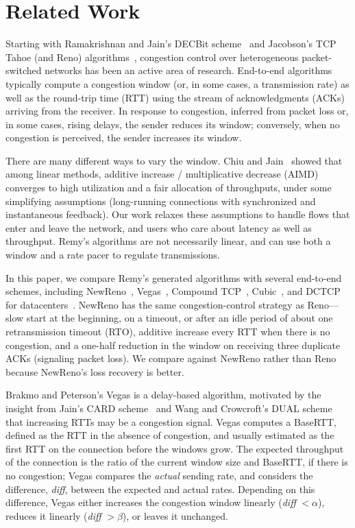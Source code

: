 \section{Related Work}
\label{remy:related}

Starting with Ramakrishnan and Jain's DECBit scheme~\cite{decbit} and
Jacobson's TCP Tahoe (and Reno) algorithms~\cite{Jacobson88},
congestion control over heterogeneous packet-switched networks has
been an active area of research. End-to-end algorithms typically
compute a congestion window (or, in some cases, a transmission rate)
as well as the round-trip time (RTT) using the stream of
acknowledgments (ACKs) arriving from the receiver. In response to
congestion, inferred from packet loss or, in some cases, rising
delays, the sender reduces its window; conversely, when no congestion
is perceived, the sender increases its window.

There are many different ways to vary the window. Chiu and
Jain~\cite{chiujain} showed that among linear methods, additive
increase / multiplicative decrease (AIMD) converges to high
utilization and a fair allocation of throughputs, under some
simplifying assumptions (long-running connections with synchronized
and instantaneous feedback). Our work relaxes these assumptions to
handle flows that enter and leave the network, and users who care
about latency as well as throughput. Remy's algorithms are not
necessarily linear, and can use both a window and a rate pacer to
regulate transmissions.

In this paper, we compare Remy's generated algorithms with several
end-to-end schemes, including NewReno~\cite{newreno},
Vegas~\cite{vegas}, Compound TCP~\cite{compound}, Cubic~\cite{cubic},
and DCTCP for datacenters~\cite{dctcp}. NewReno has the same
congestion-control strategy as Reno---slow start at the beginning, on
a timeout, or after an idle period of about one retransmission timeout
(RTO), additive increase every RTT when there is no congestion, and a
one-half reduction in the window on receiving three duplicate ACKs
(signaling packet loss). We compare against NewReno rather than Reno
because NewReno's loss recovery is better.

Brakmo and Peterson's Vegas is a delay-based algorithm, motivated by
the insight from Jain's CARD scheme~\cite{card} and Wang and Crowcroft's
DUAL scheme~\cite{dual} that increasing RTTs may be a congestion
signal.  Vegas computes a BaseRTT, defined as the RTT in the absence
of congestion, and usually estimated as the first RTT on the
connection before the windows grow. The expected throughput of the
connection is the ratio of the current window size and BaseRTT, if
there is no congestion; Vegas compares the {\em actual} sending rate,
and considers the difference, {\em diff}, between the expected and
actual rates.  Depending on this difference, Vegas either increases
the congestion window linearly ({\em diff} $< \alpha$), reduces it
linearly ({\em diff} $> \beta$), or leaves it unchanged.

